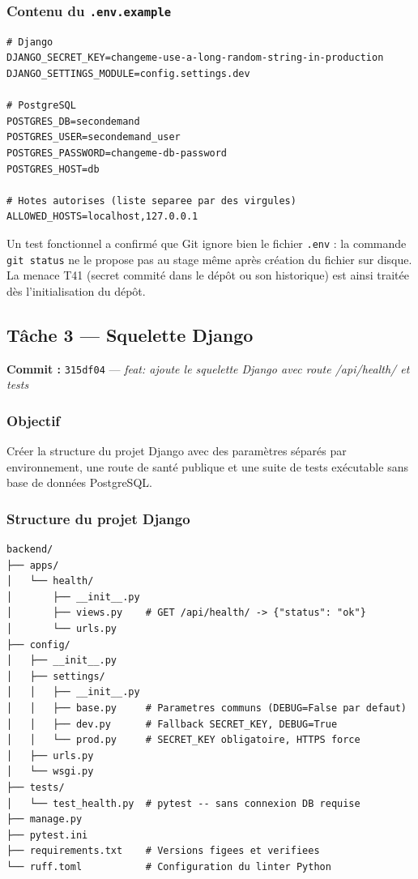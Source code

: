 \documentclass[11pt,a4paper]{article}
\begin{document}
\subsubsection*{Contenu du \texttt{.env.example}}

\begin{lstlisting}[caption={Variables d'environnement documentées (.env.example)}]
# Django
DJANGO_SECRET_KEY=changeme-use-a-long-random-string-in-production
DJANGO_SETTINGS_MODULE=config.settings.dev

# PostgreSQL
POSTGRES_DB=secondemand
POSTGRES_USER=secondemand_user
POSTGRES_PASSWORD=changeme-db-password
POSTGRES_HOST=db

# Hotes autorises (liste separee par des virgules)
ALLOWED_HOSTS=localhost,127.0.0.1
\end{lstlisting}

\begin{secbox}
Un test fonctionnel a confirmé que Git ignore bien le fichier \texttt{.env} : la commande
\texttt{git status} ne le propose pas au stage même après création du fichier sur disque.
La menace T41 (secret commité dans le dépôt ou son historique) est ainsi traitée dès
l'initialisation du dépôt.
\end{secbox}

\subsection{Tâche 3 --- Squelette Django}

\textbf{Commit :} \texttt{315df04} --- \textit{feat: ajoute le squelette Django avec route
/api/health/ et tests}

\subsubsection*{Objectif}

Créer la structure du projet Django avec des paramètres séparés par environnement, une route
de santé publique et une suite de tests exécutable sans base de données PostgreSQL.

\subsubsection*{Structure du projet Django}

\begin{lstlisting}[caption={Arborescence du backend Django}]
backend/
├── apps/
│   └── health/
│       ├── __init__.py
│       ├── views.py    # GET /api/health/ -> {"status": "ok"}
│       └── urls.py
├── config/
│   ├── __init__.py
│   ├── settings/
│   │   ├── __init__.py
│   │   ├── base.py     # Parametres communs (DEBUG=False par defaut)
│   │   ├── dev.py      # Fallback SECRET_KEY, DEBUG=True
│   │   └── prod.py     # SECRET_KEY obligatoire, HTTPS force
│   ├── urls.py
│   └── wsgi.py
├── tests/
│   └── test_health.py  # pytest -- sans connexion DB requise
├── manage.py
├── pytest.ini
├── requirements.txt    # Versions figees et verifiees
└── ruff.toml           # Configuration du linter Python
\end{lstlisting}
\end{document}
